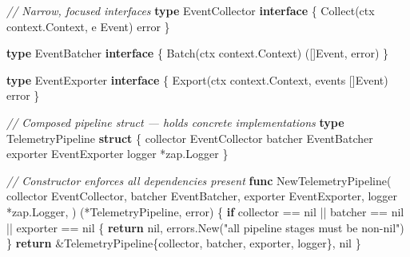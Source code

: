 \documentclass[
]{article}
\newenvironment{Shaded}{}{}
\newcommand{\CommentTok}[1]{\textcolor[rgb]{0.38,0.63,0.69}{\textit{#1}}}
\newcommand{\ControlFlowTok}[1]{\textcolor[rgb]{0.00,0.44,0.13}{\textbf{#1}}}
\newcommand{\DataTypeTok}[1]{\textcolor[rgb]{0.56,0.13,0.00}{#1}}
\newcommand{\KeywordTok}[1]{\textcolor[rgb]{0.00,0.44,0.13}{\textbf{#1}}}
\newcommand{\NormalTok}[1]{#1}
\newcommand{\OperatorTok}[1]{\textcolor[rgb]{0.40,0.40,0.40}{#1}}
\newcommand{\OtherTok}[1]{\textcolor[rgb]{0.00,0.44,0.13}{#1}}
\newcommand{\StringTok}[1]{\textcolor[rgb]{0.25,0.44,0.63}{#1}}
\begin{document}
\begin{Shaded}
\begin{Highlighting}[]
\CommentTok{// Narrow, focused interfaces}
\KeywordTok{type}\NormalTok{ EventCollector }\KeywordTok{interface} \OperatorTok{\{}
\NormalTok{    Collect}\OperatorTok{(}\NormalTok{ctx context}\OperatorTok{.}\NormalTok{Context}\OperatorTok{,}\NormalTok{ e Event}\OperatorTok{)} \DataTypeTok{error}
\OperatorTok{\}}

\KeywordTok{type}\NormalTok{ EventBatcher }\KeywordTok{interface} \OperatorTok{\{}
\NormalTok{    Batch}\OperatorTok{(}\NormalTok{ctx context}\OperatorTok{.}\NormalTok{Context}\OperatorTok{)} \OperatorTok{([]}\NormalTok{Event}\OperatorTok{,} \DataTypeTok{error}\OperatorTok{)}
\OperatorTok{\}}

\KeywordTok{type}\NormalTok{ EventExporter }\KeywordTok{interface} \OperatorTok{\{}
\NormalTok{    Export}\OperatorTok{(}\NormalTok{ctx context}\OperatorTok{.}\NormalTok{Context}\OperatorTok{,}\NormalTok{ events }\OperatorTok{[]}\NormalTok{Event}\OperatorTok{)} \DataTypeTok{error}
\OperatorTok{\}}

\CommentTok{// Composed pipeline struct — holds concrete implementations}
\KeywordTok{type}\NormalTok{ TelemetryPipeline }\KeywordTok{struct} \OperatorTok{\{}
\NormalTok{    collector EventCollector}
\NormalTok{    batcher   EventBatcher}
\NormalTok{    exporter  EventExporter}
\NormalTok{    logger    }\OperatorTok{*}\NormalTok{zap}\OperatorTok{.}\NormalTok{Logger}
\OperatorTok{\}}

\CommentTok{// Constructor enforces all dependencies present}
\KeywordTok{func}\NormalTok{ NewTelemetryPipeline}\OperatorTok{(}
\NormalTok{    collector EventCollector}\OperatorTok{,}
\NormalTok{    batcher EventBatcher}\OperatorTok{,}
\NormalTok{    exporter EventExporter}\OperatorTok{,}
\NormalTok{    logger }\OperatorTok{*}\NormalTok{zap}\OperatorTok{.}\NormalTok{Logger}\OperatorTok{,}
\OperatorTok{)} \OperatorTok{(*}\NormalTok{TelemetryPipeline}\OperatorTok{,} \DataTypeTok{error}\OperatorTok{)} \OperatorTok{\{}
    \ControlFlowTok{if}\NormalTok{ collector }\OperatorTok{==} \OtherTok{nil} \OperatorTok{||}\NormalTok{ batcher }\OperatorTok{==} \OtherTok{nil} \OperatorTok{||}\NormalTok{ exporter }\OperatorTok{==} \OtherTok{nil} \OperatorTok{\{}
        \ControlFlowTok{return} \OtherTok{nil}\OperatorTok{,}\NormalTok{ errors}\OperatorTok{.}\NormalTok{New}\OperatorTok{(}\StringTok{"all pipeline stages must be non{-}nil"}\OperatorTok{)}
    \OperatorTok{\}}
    \ControlFlowTok{return} \OperatorTok{\&}\NormalTok{TelemetryPipeline}\OperatorTok{\{}\NormalTok{collector}\OperatorTok{,}\NormalTok{ batcher}\OperatorTok{,}\NormalTok{ exporter}\OperatorTok{,}\NormalTok{ logger}\OperatorTok{\},} \OtherTok{nil}
\OperatorTok{\}}
\end{Highlighting}
\end{Shaded}
\end{document}
